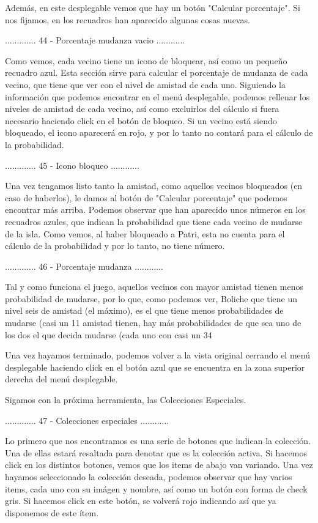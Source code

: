 Además, en este desplegable vemos que hay un botón "Calcular porcentaje". Si nos fijamos, en los
recuadros han aparecido algunas cosas nuevas.

............. 44 - Porcentaje mudanza vacio ............

Como vemos, cada vecino tiene un icono de bloquear, así como un pequeño recuadro azul. Esta sección sirve
para calcular el porcentaje de mudanza de cada vecino, que tiene que ver con el nivel de amistad de cada
uno. Siguiendo la información que podemos encontrar en el menú desplegable, podemos rellenar los niveles
de amistad de cada vecino, así como excluirlos del cálculo si fuera necesario haciendo click en el botón de
bloqueo. Si un vecino está siendo bloqueado, el icono aparecerá en rojo, y por lo tanto no contará para
el cálculo de la probabilidad.

............. 45 - Icono bloqueo ............

Una vez tengamos listo tanto la amistad, como aquellos vecinos bloqueados (en caso de haberlos),
le damos al botón de "Calcular porcentaje" que podemos encontrar más arriba. Podemos observar
que han aparecido unos números en los recuadros azules, que indican la probabilidad que tiene cada 
vecino de mudarse de la isla. Como vemos, al haber bloqueado a Patri, esta no cuenta para el cálculo
de la probabilidad y por lo tanto, no tiene número.

............. 46 - Porcentaje mudanza ............

Tal y como funciona el juego, aquellos vecinos con mayor amistad tienen menos probabilidad de mudarse,
por lo que, como podemos ver, Boliche que tiene un nivel seis de amistad (el máximo), es el que tiene
menos probabilidades de mudarse (casi un 11%
amistad tienen, hay más probabilidades de que sea uno de los dos el que decida mudarse (cada uno con
casi un 34%

Una vez hayamos terminado, podemos volver a la vista original cerrando el menú desplegable haciendo click
en el botón azul que se encuentra en la zona superior derecha del menú desplegable.

Sigamos con la próxima herramienta, las Colecciones Especiales.

............. 47 - Colecciones especiales ............

Lo primero que nos encontramos es una serie de botones que indican la colección. Una de ellas estará
resaltada para denotar que es la colección activa. Si hacemos click en los distintos botones, vemos
que los items de abajo van variando. Una vez hayamos seleccionado la colección deseada, podemos
observar que hay varios items, cada uno con su imágen y nombre, así como un botón con forma de check
gris. Si hacemos click en este botón, se volverá rojo indicando así que ya disponemos de este ítem.

